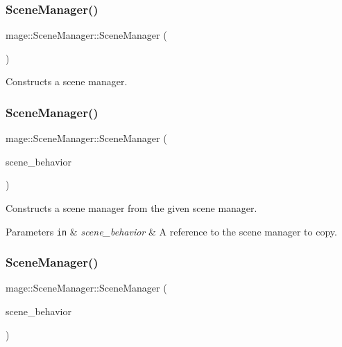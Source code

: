 \subsubsection{\texorpdfstring{Scene\+Manager()}{SceneManager()}\hspace{0.1cm}{\footnotesize\ttfamily [1/3]}}
{\footnotesize\ttfamily mage\+::\+Scene\+Manager\+::\+Scene\+Manager (\begin{DoxyParamCaption}{ }\end{DoxyParamCaption})}

Constructs a scene manager. \hypertarget{classmage_1_1_scene_manager_a450ce8e4d52483a2dcc3bb090f565373}{}\label{classmage_1_1_scene_manager_a450ce8e4d52483a2dcc3bb090f565373} 
\subsubsection{\texorpdfstring{Scene\+Manager()}{SceneManager()}\hspace{0.1cm}{\footnotesize\ttfamily [2/3]}}
{\footnotesize\ttfamily mage\+::\+Scene\+Manager\+::\+Scene\+Manager (\begin{DoxyParamCaption}\item[{const \hyperlink{classmage_1_1_scene_manager}{Scene\+Manager} \&}]{scene\+\_\+behavior }\end{DoxyParamCaption})\hspace{0.3cm}{\ttfamily [delete]}}

Constructs a scene manager from the given scene manager.


\begin{DoxyParams}[1]{Parameters}
\mbox{\tt in}  & {\em scene\+\_\+behavior} & A reference to the scene manager to copy. \\
\hline
\end{DoxyParams}
\hypertarget{classmage_1_1_scene_manager_ae8f4c6553e27b0bc00f0ea40f0e3770c}{}\label{classmage_1_1_scene_manager_ae8f4c6553e27b0bc00f0ea40f0e3770c} 
\subsubsection{\texorpdfstring{Scene\+Manager()}{SceneManager()}\hspace{0.1cm}{\footnotesize\ttfamily [3/3]}}
{\footnotesize\ttfamily mage\+::\+Scene\+Manager\+::\+Scene\+Manager (\begin{DoxyParamCaption}\item[{\hyperlink{classmage_1_1_scene_manager}{Scene\+Manager} \&\&}]{scene\+\_\+behavior }\end{DoxyParamCaption})\hspace{0.3cm}{\ttfamily [default]}}

